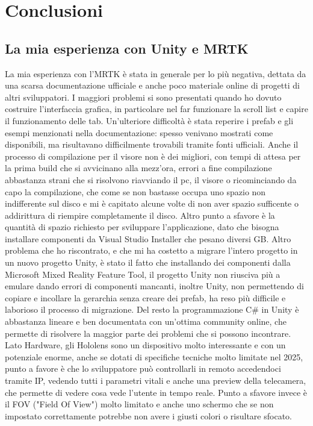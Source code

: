 \chapter{Conclusioni}
\pagestyle{plain}

\section{La mia esperienza con Unity e MRTK}
La mia esperienza con l'MRTK è stata in generale per lo più negativa, dettata da una scarsa documentazione ufficiale e anche poco materiale online di progetti di altri sviluppatori. I maggiori problemi si sono presentati quando ho dovuto costruire l'interfaccia grafica, in particolare nel far funzionare la scroll list e capire il funzionamento delle tab. Un'ulteriore difficoltà è stata reperire i prefab e gli esempi menzionati nella documentazione: spesso venivano mostrati come disponibili, ma risultavano difficilmente trovabili tramite fonti ufficiali. Anche il processo di compilazione per il visore non è dei migliori, con tempi di attesa per la prima build che si avvicinano alla mezz'ora, errori a fine compilazione abbastanza strani che si risolvono riavviando il pc, il visore o ricominciando da capo la compilazione, che come se non bastasse occupa uno spazio non indifferente sul disco e mi è capitato alcune volte di non aver spazio sufficente o addirittura di riempire completamente il disco. Altro punto a sfavore è la quantità di spazio richiesto per sviluppare l'applicazione, dato che bisogna installare componenti da Visual Studio Installer che pesano diversi GB. Altro problema che ho riscontrato, e che mi ha costetto a migrare l'intero progetto in un nuovo progetto Unity, è stato il fatto che installando dei componenti dalla Microsoft Mixed Reality Feature Tool, il progetto Unity non riusciva più a emulare dando errori di componenti mancanti, inoltre Unity, non permettendo di copiare e incollare la gerarchia senza creare dei prefab, ha reso più difficile e laborioso il processo di migrazione. Del resto la programmazione C\# in Unity è abbastanza lineare e ben documentata con un'ottima community online, che permette di risolvere la maggior parte dei problemi che si possono incontrare. Lato Hardware, gli Hololens sono un dispositivo molto interessante e con un potenziale enorme, anche se dotati di specifiche tecniche molto limitate nel 2025, punto a favore è che lo sviluppatore può controllarli in remoto accedendoci tramite IP, vedendo tutti i parametri vitali e anche una preview della telecamera, che permette di vedere cosa vede l'utente in tempo reale. Punto a sfavore invece è il FOV ("Field Of View") molto limitato e anche uno schermo che se non impostato correttamente potrebbe non avere i giusti colori o risultare sfocato.
